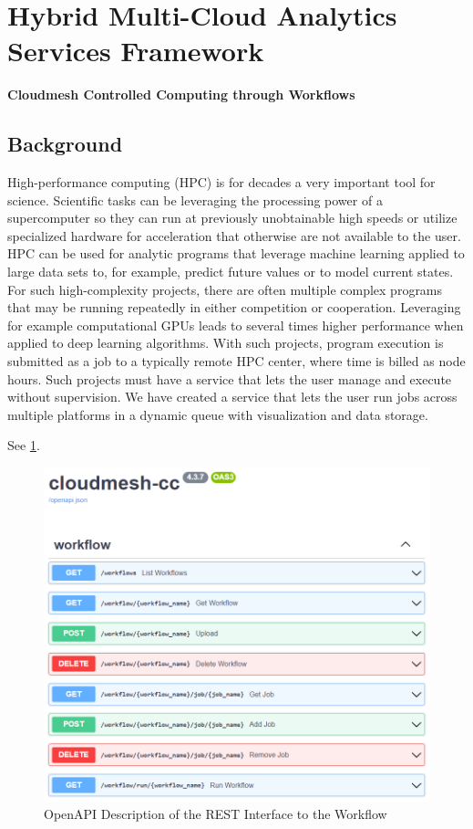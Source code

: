 
\section{Hybrid Multi-Cloud Analytics Services
Framework}\label{hybrid-multi-cloud-analytics-services-framework}

\textbf{Cloudmesh Controlled Computing through Workflows}


\subsection{Background}\label{background}

High-performance computing (HPC) is for decades a very important tool
for science. Scientific tasks can be leveraging the processing power of
a supercomputer so they can run at previously unobtainable high speeds
or utilize specialized hardware for acceleration that otherwise are not
available to the user. HPC can be used for analytic programs that
leverage machine learning applied to large data sets to, for example,
predict future values or to model current states. For such
high-complexity projects, there are often multiple complex programs that
may be running repeatedly in either competition or cooperation.
Leveraging for example computational GPUs leads to several times higher
performance when applied to deep learning algorithms. With such
projects, program execution is submitted as a job to a typically remote
HPC center, where time is billed as node hours. Such projects must have
a service that lets the user manage and execute without supervision. We
have created a service that lets the user run jobs across multiple
platforms in a dynamic queue with visualization and data storage.

See \ref{fig:fastapi-service}.

\begin{figure}
\centering
\includegraphics[width=1.0\columnwidth]{images/fastapi-service.png}
\caption{OpenAPI Description of the REST Interface to the
Workflow}\label{fig:fastapi-service}
\end{figure}

